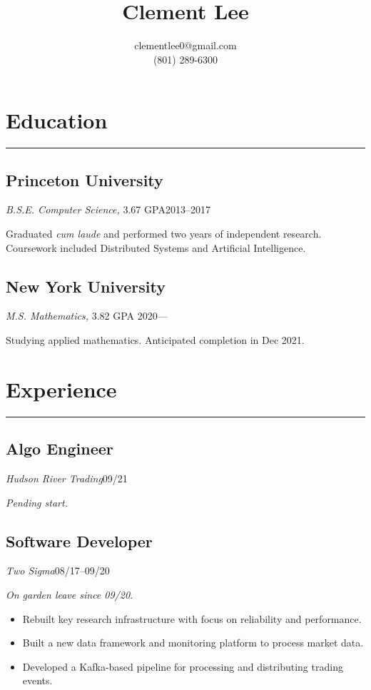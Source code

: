\documentclass[11pt]{article}
\title{\vspace{-2\baselineskip}Clement Lee\vspace{-\baselineskip}}
\author{clementlee0@gmail.com\\(801) 289-6300}
\date{}
\begin{document}
\maketitle

\vspace{-2\baselineskip}


\section*{\sc Education}
\hrule
  \subsection*{Princeton University}
  \emph{B.S.E. Computer Science,} 3.67 GPA\hfill 2013--2017

  Graduated \emph{cum laude} and performed two years of independent research.
  Coursework included Distributed Systems and Artificial Intelligence.
  
  \subsection*{New York University}
  \emph{M.S. Mathematics,} 3.82 GPA \hfill2020---
   
  Studying applied mathematics.
  Anticipated completion in Dec 2021.

\section*{\sc Experience}
\hrule
  \subsection*{Algo Engineer}
  \emph{Hudson River Trading}\hfill09/21

  \emph{Pending start.}
  
  \subsection*{Software Developer}
  \emph{Two Sigma}\hfill08/17--09/20

  \emph{On garden leave since 09/20.}
  \begin{itemize}
    \item Rebuilt key research infrastructure with focus on reliability and performance.
    \item Built a new data framework and monitoring platform to process market data.
    \item Developed a Kafka-based pipeline for processing and distributing trading events.
  \end{itemize}
\end{document}
